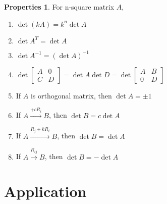 \documentclass{article}
\theoremstyle{definition}
\newtheorem{pro}{Properties}[section]
\begin{document}
\begin{pro}
    For n-square matrix $A$,
    \begin{enumerate}
        \item $\det (kA)=k^{n}\det A$
        \item $\det A^{T}=\det A$
        \item $\det A^{-1}=(\det A)^{-1}$
        \item $\det \begin{bmatrix}A&0\\C&D\end{bmatrix}=\det A\det D=\det\begin{bmatrix}A&B\\0&D\end{bmatrix}$
        \item If $A$ is orthogonal matrix, then $\det A=\pm1$
        \item If $A\xrightarrow{+cR_{i}} B$, then $\det B=c\det A$
        \item If $A\xrightarrow{R_{j}+kR_{i}} B$, then $\det B=\det A$
        \item If $A\xrightarrow{R_{ij}} B$, then $\det B=-\det A$
    \end{enumerate}
\end{pro}





\section{Application}
\end{document}
